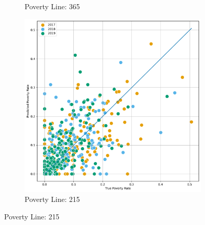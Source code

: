 \begin{figure}[H]
\begin{subfigure}[b]{0.47\textwidth}
             \caption{Poverty Line: 365}
         \end{subfigure} 
          \hfill
         \begin{subfigure}[b]{0.47\textwidth}
             \centering
             \includegraphics[width=\textwidth]{../figures/fig4_2_prediction_wb_vs_true_poverty_rate_provincia_p215_scatter.pdf}
             \caption{Poverty Line: 215}
         \end{subfigure} 
\end{figure}



